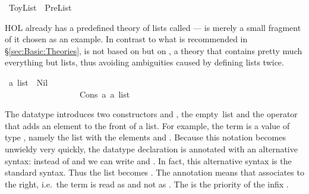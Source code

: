 %
\begin{isabellebody}%
\def\isabellecontext{ToyList}%
\ ToyList\ {\isacharequal}\ PreList{\isacharcolon}%
\begin{isamarkuptext}%
\noindent
HOL already has a predefined theory of lists called  ---
 is merely a small fragment of it chosen as an example. In
contrast to what is recommended in \S\ref{sec:Basic:Theories},
 is not based on  but on , a
theory that contains pretty much everything but lists, thus avoiding
ambiguities caused by defining lists twice.%
\end{isamarkuptext}%
\ {\isacharprime}a\ list\ {\isacharequal}\ Nil\ \ \ \ \ \ \ \ \ \ \ \ \ \ \ \ \ \ \ \ \ \ \ \ \ \ {\isacharparenleft}{\isachardoublequote}{\isacharbrackleft}{\isacharbrackright}{\isachardoublequote}{\isacharparenright}\isanewline
\ \ \ \ \ \ \ \ \ \ \ \ \ \ \ \ \ {\isacharbar}\ Cons\ {\isacharprime}a\ {\isachardoublequote}{\isacharprime}a\ list{\isachardoublequote}\ \ \ \ \ \ \ \ \ \ \ \ {\isacharparenleft}\ {\isachardoublequote}{\isacharhash}{\isachardoublequote}\ {}{}{\isacharparenright}%
\begin{isamarkuptext}%
\noindent
{}
The datatype  introduces two
constructors  and , the
empty~list and the operator that adds an element to the front of a list. For
example, the term  is a value of
type , namely the list with the elements  and
. Because this notation becomes unwieldy very quickly, the
datatype declaration is annotated with an alternative syntax: instead of
 and  we can write
\isa{{\isacharbrackleft}{\isacharbrackright}} and
. In fact, this
alternative syntax is the standard syntax. Thus the list  becomes . The annotation
means that \isa{{\isacharhash}} associates to
the right, i.e.\ the term  is read as 
and not as .
The  is the priority of the infix \isa{{\isacharhash}}.


\end{isamarkuptext}
\end{isabellebody}
